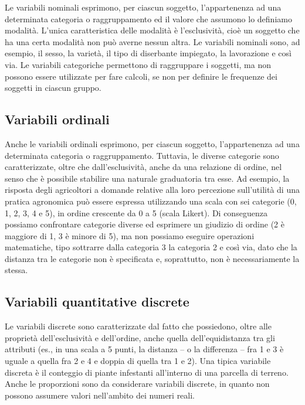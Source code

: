 \documentclass[
  12pt,
]{book}
\begin{document}
Le variabili nominali esprimono, per ciascun soggetto, l'appartenenza ad una determinata categoria o raggruppamento ed il valore che assumono lo definiamo modalità. L'unica caratteristica delle modalità è l'esclusività, cioè un soggetto che ha una certa modalità non può averne nessun altra. Le variabili nominali sono, ad esempio, il sesso, la varietà, il tipo di diserbante impiegato, la lavorazione e così via. Le variabili categoriche permettono di raggruppare i soggetti, ma non possono essere utilizzate per fare calcoli, se non per definire le frequenze dei soggetti in ciascun gruppo.

\hypertarget{variabili-ordinali}{%
\subsection{Variabili ordinali}\label{variabili-ordinali}}

Anche le variabili ordinali esprimono, per ciascun soggetto, l'appartenenza ad una determinata categoria o raggruppamento. Tuttavia, le diverse categorie sono caratterizzate, oltre che dall'esclusività, anche da una relazione di ordine, nel senso che è possibile stabilire una naturale graduatoria tra esse. Ad esempio, la risposta degli agricoltori a domande relative alla loro percezione sull'utilità di una pratica agronomica può essere espressa utilizzando una scala con sei categorie (0, 1, 2, 3, 4 e 5), in ordine crescente da 0 a 5 (scala Likert). Di conseguenza possiamo confrontare categorie diverse ed esprimere un giudizio di ordine (2 è maggiore di 1, 3 è minore di 5), ma non possiamo eseguire operazioni matematiche, tipo sottrarre dalla categoria 3 la categoria 2 e così via, dato che la distanza tra le categorie non è specificata e, soprattutto, non è necessariamente la stessa.

\hypertarget{variabili-quantitative-discrete}{%
\subsection{Variabili quantitative discrete}\label{variabili-quantitative-discrete}}

Le variabili discrete sono caratterizzate dal fatto che possiedono, oltre alle proprietà dell'esclusività e dell'ordine, anche quella dell'equidistanza tra gli attributi (es., in una scala a 5 punti, la distanza -- o la differenza -- fra 1 e 3 è uguale a quella fra 2 e 4 e doppia di quella tra 1 e 2). Una tipica variabile discreta è il conteggio di piante infestanti all'interno di una parcella di terreno. Anche le proporzioni sono da considerare variabili discrete, in quanto non possono assumere valori nell'ambito dei numeri reali.
\end{document}
